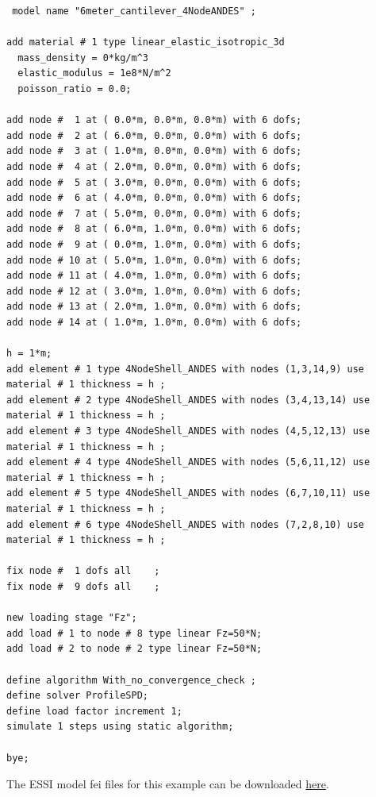 \documentclass[fleqn,11pt]{article}
\begin{document}
%
\begin{lstlisting}
 model name "6meter_cantilever_4NodeANDES" ;
      
add material # 1 type linear_elastic_isotropic_3d
  mass_density = 0*kg/m^3
  elastic_modulus = 1e8*N/m^2
  poisson_ratio = 0.0;

add node #  1 at ( 0.0*m, 0.0*m, 0.0*m) with 6 dofs;
add node #  2 at ( 6.0*m, 0.0*m, 0.0*m) with 6 dofs;
add node #  3 at ( 1.0*m, 0.0*m, 0.0*m) with 6 dofs;
add node #  4 at ( 2.0*m, 0.0*m, 0.0*m) with 6 dofs;
add node #  5 at ( 3.0*m, 0.0*m, 0.0*m) with 6 dofs;
add node #  6 at ( 4.0*m, 0.0*m, 0.0*m) with 6 dofs;
add node #  7 at ( 5.0*m, 0.0*m, 0.0*m) with 6 dofs;
add node #  8 at ( 6.0*m, 1.0*m, 0.0*m) with 6 dofs;
add node #  9 at ( 0.0*m, 1.0*m, 0.0*m) with 6 dofs;
add node # 10 at ( 5.0*m, 1.0*m, 0.0*m) with 6 dofs;
add node # 11 at ( 4.0*m, 1.0*m, 0.0*m) with 6 dofs;
add node # 12 at ( 3.0*m, 1.0*m, 0.0*m) with 6 dofs;
add node # 13 at ( 2.0*m, 1.0*m, 0.0*m) with 6 dofs;
add node # 14 at ( 1.0*m, 1.0*m, 0.0*m) with 6 dofs;

h = 1*m; 
add element # 1 type 4NodeShell_ANDES with nodes (1,3,14,9) use material # 1 thickness = h ; 
add element # 2 type 4NodeShell_ANDES with nodes (3,4,13,14) use material # 1 thickness = h ; 
add element # 3 type 4NodeShell_ANDES with nodes (4,5,12,13) use material # 1 thickness = h ; 
add element # 4 type 4NodeShell_ANDES with nodes (5,6,11,12) use material # 1 thickness = h ; 
add element # 5 type 4NodeShell_ANDES with nodes (6,7,10,11) use material # 1 thickness = h ; 
add element # 6 type 4NodeShell_ANDES with nodes (7,2,8,10) use material # 1 thickness = h ; 

fix node #  1 dofs all    ;
fix node #  9 dofs all    ;

new loading stage "Fz";
add load # 1 to node # 8 type linear Fz=50*N;
add load # 2 to node # 2 type linear Fz=50*N;

define algorithm With_no_convergence_check ;
define solver ProfileSPD;
define load factor increment 1;
simulate 1 steps using static algorithm;

bye;
\end{lstlisting}

The ESSI model fei files for this example can be downloaded 
\href{https://github.com/BorisJeremic/Real-ESSI-Examples/blob/master/model_fei_file/ANDESshell_cantilever_perpendicular_to_plane/ANDESshell_cantilever_perpendicular_to_plane.tgz?raw=true}{here}.
\end{document}
